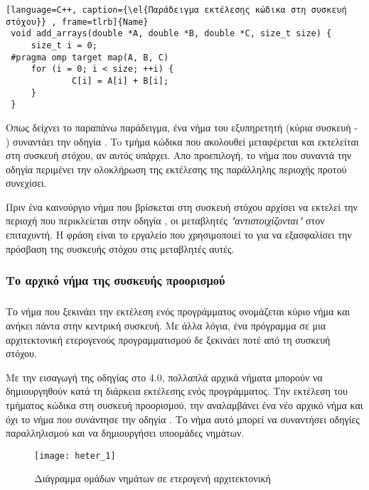 \begin{lstlisting}[language=C++, caption={\el{Παράδειγμα εκτέλεσης κώδικα στη συσκευή στόχου}} , frame=tlrb]{Name}
 void add_arrays(double *A, double *B, double *C, size_t size) {
     size_t i = 0;
 #pragma omp target map(A, B, C)
     for (i = 0; i < size; ++i) {
             C[i] = A[i] + B[i];
     }
 }
\end{lstlisting}

Οπως δείχνει το παραπάνω παράδειγμα, ένα νήμα του εξυπηρετητή (κύρια συσκευή - \emph{}) συναντάει την οδηγία
\emph{}. To τμήμα κώδικα που ακολουθεί μεταφέρεται και εκτελείται στη συσκευή στόχου, αν
αυτός υπάρχει. Απο προεπιλογή, το νήμα που συναντά την οδηγία περιμένει την ολοκλήρωση της εκτέλεσης της παράλληλης
περιοχής προτού συνεχίσει.

Πριν ένα καινούργιο νήμα που βρίσκεται στη συσκευή στόχου αρχίσει να εκτελεί την περιοχή που περικλείεται στην οδηγία
\emph{}, οι μεταβλητές \emph{} \emph{"αντιστοιχίζονται"} στον επιταχυντή. Η φράση
\emph{} είναι το εργαλείο που χρησιμοποιεί το \emph{} για να εξασφαλίσει την πρόσβαση της
συσκευής στόχου στις μεταβλητές αυτές.


\subsubsection{Το αρχικό νήμα της συσκευής προορισμού}
\subparagraph{}
Το νήμα που ξεκινάει την εκτέλεση ενός προγράμματος ονομάζεται κύριο νήμα και ανήκει πάντα στην κεντρική συσκευή. Με
άλλα λόγια, ένα πρόγραμμα σε μια αρχιτεκτονική ετερογενούς προγραμματισμού δε ξεκινάει ποτέ από τη συσκευή στόχου.

Με την εισαγωγή της οδηγίας \textbf{} στο \emph{} 4.0, πολλαπλά αρχικά νήματα μπορούν να
δημιουργηθούν κατά τη διάρκεια εκτέλεσης ενός προγράμματος. Την εκτέλεση του τμήματος κώδικα στη συσκευή προορισμού, την
αναλαμβάνει ένα νέο αρχικό νήμα και όχι το νήμα που συνάντησε την οδηγία \emph{}. Το νήμα αυτό μπορεί να
συναντήσει οδηγίες παραλληλισμού και να δημιουργήσει υποομάδες νημάτων. \ \\
\begin{figure}[h]
\texttt{[image: heter\_1]}
\centering
\captionsetup{justification=centering, singlelinecheck=false}
	\caption{Διάγραμμα ομάδων νημάτων σε ετερογενή αρχιτεκτονική}
\label{fig:heter_1}
\end{figure}


